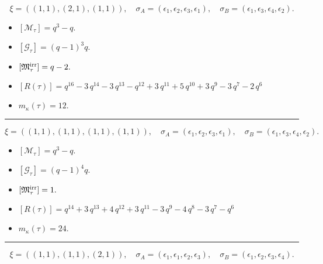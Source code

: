 \documentclass[10pt,a4paper]{amsart}
\begin{document}
$$\xi = ({(1, 1), (2, 1)}, {(1, 1)}),\quad \sigma_A = ({{\epsilon_1}, {\epsilon_2, \epsilon_3}}, {{\epsilon_1}}),\quad \sigma_B = ({{\epsilon_1}, {\epsilon_3, \epsilon_4}}, {{\epsilon_2}}).$$

\begin{itemize}
 \item $[\mathcal{M}_{\tau}] = q^{3} - q .$

 \item $[\mathcal{G}_{\tau}] = {\left(q - 1\right)}^{3} q .$

 \item $[{\frak M}_{\tau}^{\textrm{irr}}] = q - 2 .$

 \item $[R(\tau)] = q^{16} - 3 \, q^{14} - 3 \, q^{13} - q^{12} + 3 \, q^{11} + 5 \, q^{10} + 3 \, q^{9} - 3 \, q^{7} - 2 \, q^{6} $

 \item $m_{\kappa}(\tau) = 12 .$

 \end{itemize}
\noindent\rule{8cm}{0.4pt}

$$\xi = ({(1, 1), (1, 1), (1, 1)}, {(1, 1)}),\quad \sigma_A = ({{\epsilon_1}, {\epsilon_2}, {\epsilon_3}}, {{\epsilon_1}}),\quad \sigma_B = ({{\epsilon_1}, {\epsilon_3}, {\epsilon_4}}, {{\epsilon_2}}).$$

\begin{itemize}
 \item $[\mathcal{M}_{\tau}] = q^{3} - q .$

 \item $[\mathcal{G}_{\tau}] = {\left(q - 1\right)}^{4} q .$

 \item $[{\frak M}_{\tau}^{\textrm{irr}}] = 1 .$

 \item $[R(\tau)] = q^{14} + 3 \, q^{13} + 4 \, q^{12} + 3 \, q^{11} - 3 \, q^{9} - 4 \, q^{8} - 3 \, q^{7} - q^{6} $

 \item $m_{\kappa}(\tau) = 24 .$

 \end{itemize}
\noindent\rule{8cm}{0.4pt}

$$\xi = ({(1, 1), (1, 1)}, {(2, 1)}),\quad \sigma_A = ({{\epsilon_1}, {\epsilon_1}}, {{\epsilon_2, \epsilon_3}}),\quad \sigma_B = ({{\epsilon_1}, {\epsilon_2}}, {{\epsilon_3, \epsilon_4}}).$$
\end{document}
